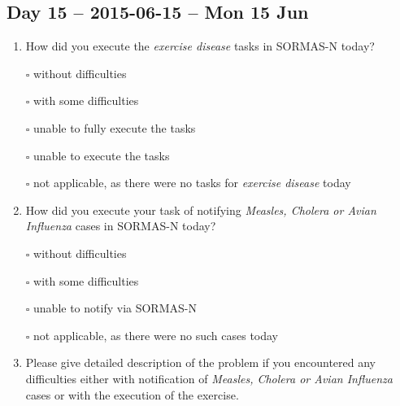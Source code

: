 \documentclass[a4paper, titlepage]{tufte-handout}
\begin{document}
\subsection{Day 15 -- 2015-06-15 -- Mon 15 Jun}
\label{sec-8-11}
\begin{enumerate}
\item How did you execute the \emph{exercise disease} tasks in SORMAS-N today?

\quad $\square$ without difficulties

\quad $\square$ with some difficulties

\quad $\square$ unable to fully execute the tasks

\quad $\square$ unable to execute the tasks

\quad $\square$ not applicable, as there were no tasks for \emph{exercise disease} today

\item How did you execute your task of notifying \emph{Measles, Cholera or Avian Influenza} cases in SORMAS-N today?

\quad $\square$ without difficulties

\quad $\square$ with some difficulties

\quad $\square$ unable to notify via SORMAS-N

\quad $\square$ not applicable, as there were no such cases today

\item Please give detailed description of the problem if you encountered any difficulties either with notification of \emph{Measles, Cholera or Avian Influenza} cases or with the execution of the exercise.

\hrulefill

\hrulefill

\hrulefill

\hrulefill

\hrulefill

\hrulefill

\hrulefill

\hrulefill

\hrulefill

\hrulefill
\end{enumerate}

\newpage
\end{document}
